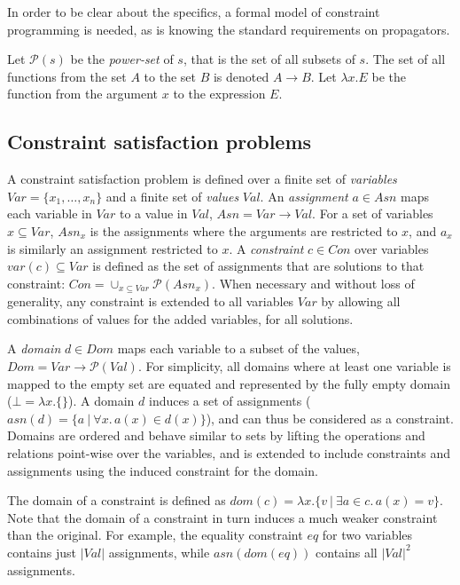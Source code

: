\documentclass[runningheads]{llncs}
\newcommand{\Asn}{\ensuremath{\mathit{Asn}}}
\newcommand{\Con}{\ensuremath{\mathit{Con}}}
\newcommand{\Dom}{\ensuremath{\mathit{Dom}}}
\newcommand{\dom}{\ensuremath{\mathit{dom}}}
\newcommand{\Val}{\ensuremath{\mathit{Val}}}
\newcommand{\Var}{\ensuremath{\mathit{Var}}}
\begin{document}
In order to be clear about the specifics, a formal model of constraint
programming is needed, as is knowing the standard requirements on
propagators.

Let $\mathcal{P}(s)$ be the \emph{power-set} of $s$,
that is the set of all subsets of $s$. The set of all functions from
the set $A$ to the set $B$ is denoted $A\to B$. Let $\lambda x.E$ be the
function from the argument $x$ to the expression $E$. 

\subsection{Constraint satisfaction problems}
\label{sec:cp::formal}

A constraint satisfaction problem is defined over a finite set of
\emph{variables} $\Var=\{x_1,\ldots,x_n\}$ and a finite set of
\emph{values} $\Val$. An \emph{assignment} $a\in \Asn$
maps each variable in $\Var$ to a value in $\Val$, $\Asn=\Var\to \Val$. For a set of
variables $x\subseteq \Var$, $\Asn_x$ is the assignments where the
arguments are restricted to $x$, and $a_x$ is similarly an assignment restricted to
$x$. A \emph{constraint} $c\in \Con$ over variables
$var(c)\subseteq \Var$ is defined as the set of assignments that are
solutions to that constraint:
$\Con = \cup_{x\subseteq\Var}\mathcal{P}(\Asn_x)$.
When necessary and without loss of generality, any constraint is
extended to all variables $\Var$ by allowing all combinations of
values for the added variables, for all solutions.

A \emph{domain} $d\in \Dom$ maps each variable to a subset of the
values, $\Dom=\Var\to \mathcal{P}(\Val)$. For simplicity, all domains
where at least one variable is mapped to the empty set are equated and
represented by the fully empty domain ($\bot=\lambda x. \{\}$). A
domain $d$ induces a set of assignments
($asn(d)=\{a\ |\ \forall x.\, a(x) \in d(x)\}$), and can thus be
considered as a constraint. Domains are ordered and behave similar to
sets by lifting the operations and relations point-wise over the
variables, and is extended to include constraints and assignments
using the induced constraint for the domain.

The domain of a constraint is defined as
$\dom(c)=\lambda x. \{v\ |\ \exists a\in c.\, a(x) = v\}$. Note that
the domain of a constraint in turn induces a much weaker constraint
than the original. For example, the equality constraint $eq$ for two
variables contains just $|\!\Val|$ assignments, while $asn(\dom(eq))$
contains all $|\!\Val|^2$ assignments.
\end{document}
